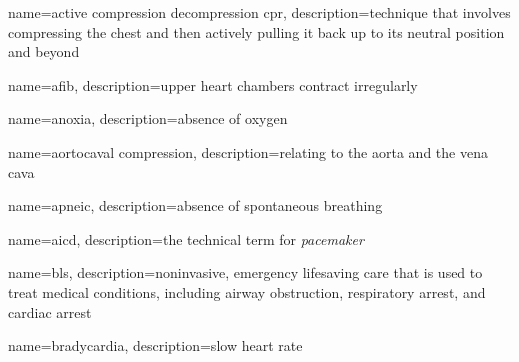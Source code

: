 \documentclass[../../EMT-169.tex]{subfiles}
\begin{document}
\setcounter{chapter}{12}
\label{ch:chapter13}
\clearpage
	

	{
		name=active compression decompression \acrshort{cpr},
		description={technique that involves compressing the chest and then actively pulling it back up to its neutral position and beyond}
	}

	{
		name=\acrfull{afib},
		description={upper heart chambers contract irregularly}
	}


	{
		name=anoxia,
		description={absence of oxygen}
	}

	{
		name=aortocaval compression,
		description={relating to the aorta and the vena cava}
	}

	{
		name=apneic,
		description={absence of spontaneous breathing}
	}

	{
		name=\acrfull{aicd},
		description={the technical term for \emph{pacemaker}}
	}

	{
		name=\acrfull{bls},
		description={noninvasive, emergency lifesaving care that is used to treat medical conditions, including airway obstruction, respiratory arrest, and cardiac arrest}
	}

	{
		name=bradycardia,
		description={slow heart rate}
	}
\end{document}
